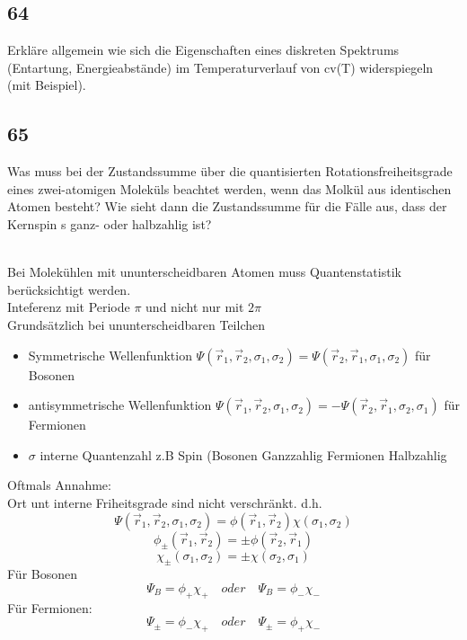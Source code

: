 \documentclass[12pt,a4paper]{report}
\newenvironment{myfrag}{\begin{it}}{\end{it}\vspace{3mm}\par}
\numberwithin{equation}{section}
\begin{document}
\subsection{64}
\begin{myfrag}
Erkläre allgemein wie sich die Eigenschaften eines diskreten Spektrums
(Entartung, Energieabstände) im Temperaturverlauf von cv(T) widerspiegeln
(mit Beispiel).
\end{myfrag}
\subsection{65}
\begin{myfrag}
Was muss bei der Zustandssumme über die quantisierten
Rotationsfreiheitsgrade eines zwei-atomigen Moleküls beachtet werden, wenn
das Molkül aus identischen Atomen besteht? Wie sieht dann die
Zustandssumme für die Fälle aus, dass der Kernspin s ganz- oder halbzahlig
ist?
\end{myfrag} \quad \\
Bei Molekühlen mit ununterscheidbaren Atomen muss Quantenstatistik berücksichtigt werden. \\
Inteferenz mit Periode $\pi $ und nicht nur mit $ 2 \pi $ \\[1.5ex]
Grundsätzlich bei ununterscheidbaren Teilchen 
\\
\begin{itemize}
\item Symmetrische Wellenfunktion $ \Psi (\vec{r} _1 , \vec{r}_2 , \sigma _1 , \sigma _2 ) = \Psi (\vec{r} _2 , \vec{r}_1 , \sigma _1 , \sigma _2 ) $ für Bosonen
\item antisymmetrische Wellenfunktion $\Psi (\vec{r} _1 , \vec{r}_2 , \sigma _1 , \sigma _2 ) = - \Psi (\vec{r} _2 , \vec{r}_1 , \sigma _2 , \sigma _1 )$ für Fermionen
\item $\sigma $ \glqq interne \grqq Quantenzahl z.B Spin (Bosonen Ganzzahlig Fermionen Halbzahlig
\end{itemize}
Oftmals Annahme: \\[1.5ex] 
Ort unt interne Friheitsgrade sind nicht verschränkt.
d.h. $$\Psi (\vec{r} _1 , \vec{r}_2 , \sigma _1 , \sigma _2 ) = \phi (\vec{r} _1 , \vec{r}_2) \chi ( \sigma _1 , \sigma _2 )$$
$$ \phi _\pm (\vec{r} _1 , \vec{r}_2) = \pm \phi (\vec{r} _2 , \vec{r}_1)$$
$$\chi_\pm ( \sigma _1 , \sigma _2 ) = \pm \chi ( \sigma _2 , \sigma _1 )$$
Für Bosonen $$ \Psi_B = \phi_+ \chi_+ \quad oder \quad \Psi_B = \phi_-\chi_- $$
Für Fermionen: $$ \Psi_\pm = \phi_- \chi_+ \quad oder \quad \Psi_\pm = \phi_+\chi_-$$
\end{document}
